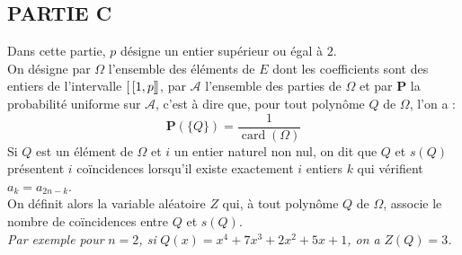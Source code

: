 \documentclass[11pt]{article}%
\begin{document}
\subsection*{PARTIE C}

Dans cette partie, $p$ désigne un entier supérieur ou égal à $2$.\\
On désigne par $\Omega $ l'ensemble des éléments de $E$ dont les
coefficients sont des entiers de l'intervalle $[ \
\hspace{-0.15em}[1,p]\hspace{-0.13em}]$, par $\mathcal{A}$ l'ensemble
des parties de $\Omega $ et par $\mathbf{P}$ la probabilité uniforme
sur $\mathcal{A}$, c'est à dire que,
pour tout polynôme $Q$ de $\Omega $, l'on a :
\[
\mathbf{P}\left( \{Q\}\right) = \dfrac{1}{\operatorname{card}(\Omega )}
\]
Si $Q$ est un élément de $\Omega $ et $i$ un entier naturel non nul, on
dit
que $Q$ et $s(Q)$ présentent $i$ coïncidences lorsqu'il existe
exactement $i$
entiers $k$ qui vérifient $a_{k} = a_{2n-k}$. \\
On définit alors la variable aléatoire $Z$ qui, à tout polynôme $Q$ de
$\Omega $, associe le nombre de coïncidences entre $Q$ et $s(Q)$. \\
\textit{Par exemple pour }$n = 2$\textit{, si }$Q(x) = x^{4} + 7x^{3} +
2x^{2} + 5x + 1$\textit{, on a }$Z(Q) = 3$\textit{.}
\end{document}
